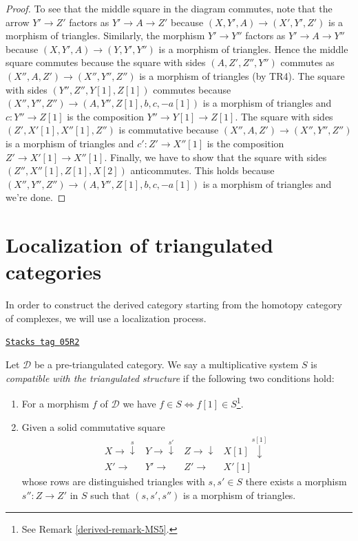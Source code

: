 \begin{proof}
\medskip\noindent
To see that the middle square in the diagram commutes, note
that the arrow $Y' \to Z'$ factors as $Y' \to A \to Z'$
because $(X, Y', A) \to (X', Y', Z')$ is a morphism of triangles.
Similarly, the morphism $Y' \to Y''$ factors as
$Y' \to A \to Y''$ because $(X, Y', A) \to (Y, Y', Y'')$ is a
morphism of triangles. Hence the middle square commutes because
the square with sides $(A, Z', Z'', Y'')$ commutes as
$(X'', A, Z') \to (X'', Y'', Z'')$ is a morphism of triangles (by TR4).
The square with sides $(Y'', Z'', Y[1], Z[1])$ commutes
because $(X'', Y'', Z'') \to (A, Y'', Z[1], b, c , -a[1])$
is a morphism of triangles and $c : Y'' \to Z[1]$ is the composition
$Y'' \to Y[1] \to Z[1]$.
The square with sides $(Z', X'[1], X''[1], Z'')$ is commutative
because $(X'', A, Z') \to (X'', Y'', Z'')$ is a morphism of triangles
and $c' : Z' \to X''[1]$ is the composition $Z' \to X'[1] \to X''[1]$.
Finally, we have to show that the square with sides
$(Z'', X''[1], Z[1], X[2])$ anticommutes. This holds because
$(X'', Y'', Z'') \to (A, Y'', Z[1], b, c , -a[1])$
is a morphism of triangles and we're done.
\end{proof}

\section{Localization of triangulated categories}
\label{derived-section-localization}
In order to construct the derived category starting from the homotopy
category of complexes, we will use a localization process.

\begin{definition}[Localization]
\label{derived-definition-localization}
\href{https://stacks.math.columbia.edu/tag/05R2}{\texttt{Stacks tag 05R2}}

Let $\mathcal{D}$ be a pre-triangulated category. We say a multiplicative
system $S$ is {\it compatible with the triangulated structure} if
the following two conditions hold:
\begin{enumerate}
\item[MS5] For a morphism $f$ of $\mathcal{D}$ we have
$f \in S \Leftrightarrow f[1] \in S$\footnote{See Remark \ref{derived-remark-MS5}.}.
\item[MS6] Given a solid commutative square
$$
\begin{array}{cccc}X \longrightarrow\overset{s}{\downarrow} & Y \longrightarrow\overset{s'}{\downarrow} & Z \longrightarrow\downarrow & X[1] \overset{s[1]}{\downarrow} \\ X' \longrightarrow & Y' \longrightarrow & Z' \longrightarrow & X'[1]\end{array}
$$
whose rows are distinguished triangles with $s, s' \in S$
there exists a morphism $s'' : Z \to Z'$ in $S$ such that
$(s, s', s'')$ is a morphism of triangles.
\end{enumerate}
\end{definition}

